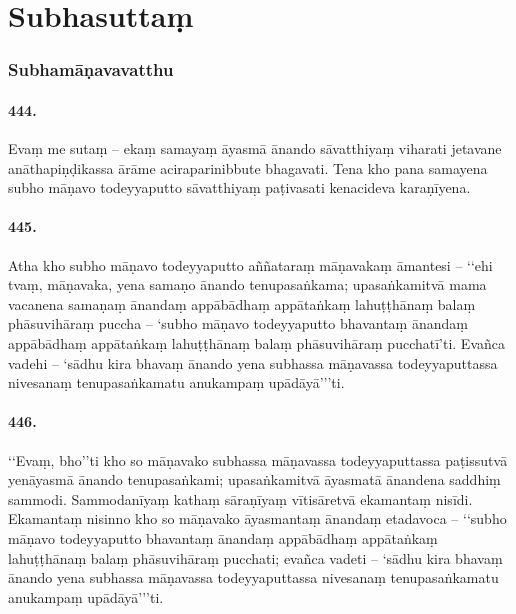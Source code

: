 \section{Subhasuttaṃ}

\subsubsection{Subhamāṇavavatthu}

\paragraph{444.} Evaṃ me sutaṃ – ekaṃ samayaṃ āyasmā ānando sāvatthiyaṃ viharati jetavane anāthapiṇḍikassa ārāme aciraparinibbute bhagavati. Tena kho pana samayena subho māṇavo todeyyaputto sāvatthiyaṃ paṭivasati kenacideva karaṇīyena.

\paragraph{445.} Atha kho subho māṇavo todeyyaputto aññataraṃ māṇavakaṃ āmantesi – ‘‘ehi tvaṃ, māṇavaka, yena samaṇo ānando tenupasaṅkama; upasaṅkamitvā mama vacanena samaṇaṃ ānandaṃ appābādhaṃ appātaṅkaṃ lahuṭṭhānaṃ balaṃ phāsuvihāraṃ puccha – ‘subho māṇavo todeyyaputto bhavantaṃ ānandaṃ appābādhaṃ appātaṅkaṃ lahuṭṭhānaṃ balaṃ phāsuvihāraṃ pucchatī’ti. Evañca vadehi – ‘sādhu kira bhavaṃ ānando yena subhassa māṇavassa todeyyaputtassa nivesanaṃ tenupasaṅkamatu anukampaṃ upādāyā’’’ti.

\paragraph{446.} ‘‘Evaṃ, bho’’ti kho so māṇavako subhassa māṇavassa todeyyaputtassa paṭissutvā yenāyasmā ānando tenupasaṅkami; upasaṅkamitvā āyasmatā ānandena saddhiṃ sammodi. Sammodanīyaṃ kathaṃ sāraṇīyaṃ vītisāretvā ekamantaṃ nisīdi. Ekamantaṃ nisinno kho so māṇavako āyasmantaṃ ānandaṃ etadavoca – ‘‘subho māṇavo todeyyaputto bhavantaṃ ānandaṃ appābādhaṃ appātaṅkaṃ lahuṭṭhānaṃ balaṃ phāsuvihāraṃ pucchati; evañca vadeti – ‘sādhu kira bhavaṃ ānando yena subhassa māṇavassa todeyyaputtassa nivesanaṃ tenupasaṅkamatu anukampaṃ upādāyā’’’ti.

